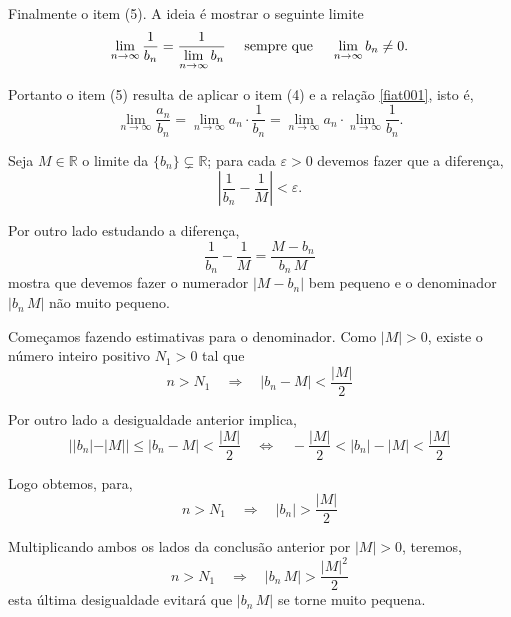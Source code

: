 Finalmente o item (5). A ideia \'{e} mostrar o seguinte limite
\begin{equation}\label{fiat001}
  \lim_{n\to\infty}\frac{1}{b_n}=\dfrac{1}{\displaystyle{\lim_{n\to\infty}b_n}}\quad \text{ sempre que }\quad \lim_{n\to\infty}b_n\neq 0.
\end{equation}

Portanto o item (5) resulta de aplicar o item (4) e a rela\c{c}\~{a}o \eqref{fiat001}, isto \'{e},
\begin{equation*}
    \lim_{n\to\infty}\frac{a_n}{b_n}=\lim_{n\to\infty}a_n\cdot \frac{1}{b_n}=\lim_{n\to\infty}a_n\cdot \lim_{n\to\infty}\frac{1}{b_n}.
\end{equation*}

Seja $M\in \mathbb{R}$ o limite da \seq $\{b_n\}\subsetneq \mathbb{R}$; para cada $\varepsilon>0$ devemos fazer que a diferen\c{c}a,
\begin{equation*}
    \left|\frac{1}{b_n}-\frac{1}{M} \right|<\varepsilon.
\end{equation*}

Por outro lado estudando a diferen\c{c}a,
\begin{equation*}
    \frac{1}{b_n}-\frac{1}{M}=\dfrac{M-b_n}{b_n\,M}
\end{equation*}
mostra que devemos fazer o numerador $|M-b_n|$ bem pequeno e o denominador $|b_n\,M|$ n\~{a}o muito pequeno.

Come\c{c}amos fazendo estimativas para o denominador. Como $|M|>0$, existe o n\'{u}mero inteiro positivo $N_1>0$ tal que
\begin{equation*}
    n>N_1\quad \Rightarrow \quad |b_n-M|<\dfrac{|M|}{2}
\end{equation*}

Por outro lado a desigualdade anterior implica,
\begin{equation*}
||b_n|-|M||\leq |b_n-M|<\dfrac{|M|}{2}\quad \Leftrightarrow \quad -\frac{|M|}{2}<|b_n|-|M|<\frac{|M|}{2}
\end{equation*}

Logo obtemos, para,
\begin{equation*}
    n>N_1\quad \Rightarrow \quad |b_n|>\dfrac{|M|}{2}
\end{equation*}

Multiplicando ambos os lados da conclus\~{a}o anterior por $|M|>0$, teremos,
\begin{equation*}
    n>N_1\quad \Rightarrow \quad |b_n\,M|>\dfrac{|M|^2}{2}
\end{equation*}
esta \'{u}ltima desigualdade evitar\'{a} que $|b_n\,M|$ se torne muito pequena.

